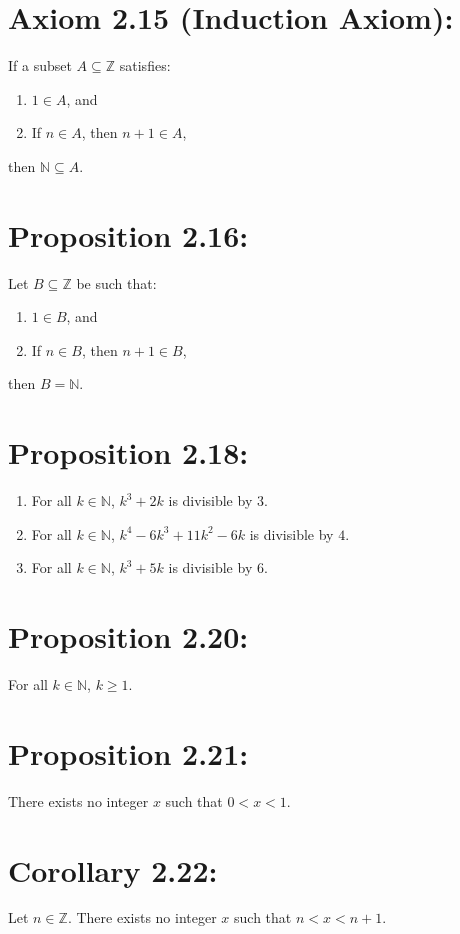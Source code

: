 \section*{Axiom 2.15 (Induction Axiom):}
If a subset $A \subseteq \mathbb{Z}$ satisfies:
\begin{enumerate}
    \item $1 \in A$, and
    \item If $n \in A$, then $n+1 \in A$,
\end{enumerate}
then $\mathbb{N} \subseteq A$.

\section*{Proposition 2.16:}
Let $B \subseteq \mathbb{Z}$ be such that:
\begin{enumerate}
    \item $1 \in B$, and
    \item If $n \in B$, then $n+1 \in B$,
\end{enumerate}
then $B = \mathbb{N}$.

\section*{Proposition 2.18:}
\begin{enumerate}[label=(\roman*)]
    \item For all $k \in \mathbb{N}$, $k^3+2k$ is divisible by $3$.
    \item For all $k \in \mathbb{N}$, $k^4-6k^3+11k^2-6k$ is divisible by $4$.
    \item For all $k \in \mathbb{N}$, $k^3+5k$ is divisible by $6$.
\end{enumerate}

\section*{Proposition 2.20:}
For all $k \in \mathbb{N}$, $k \geq 1$.

\section*{Proposition 2.21:}
There exists no integer $x$ such that $0 < x < 1$.

\section*{Corollary 2.22:}
Let $n \in \mathbb{Z}$. There exists no integer $x$ such that $n < x < n+1$.

